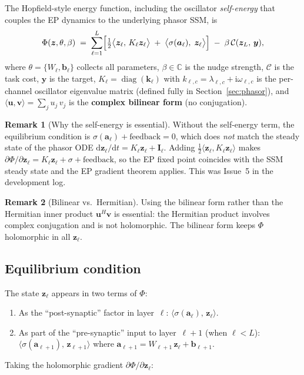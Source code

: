 \documentclass[11pt]{article}
\newcommand{\C}{\mathbb{C}}
\newcommand{\im}{\mathrm{i}}
\newcommand{\dd}{\mathrm{d}}
\theoremstyle{definition}
\newtheorem{remark}{Remark}
\DeclareMathOperator{\diag}{diag}
\begin{document}
The Hopfield-style energy function, including the oscillator
\emph{self-energy} that couples the EP dynamics to the underlying
phasor SSM, is
\begin{equation}\label{eq:energy}
  \Phi(\bm{z},\theta,\beta)
  \;=\;
  \sum_{\ell=1}^{L}
    \Bigl[
      \tfrac{1}{2}\bigl\langle\bm{z}_\ell,\,K_\ell\bm{z}_\ell\bigr\rangle
      \;+\;
      \bigl\langle
        \sigma(\bm{a}_\ell),\;
        \bm{z}_\ell
      \bigr\rangle
    \Bigr]
  \;-\;
  \beta\,\mathcal{C}(\bm{z}_L,\,\bm{y}),
\end{equation}
where $\theta=\{W_\ell,\bm{b}_\ell\}$ collects all parameters,
$\beta\in\C$ is the nudge strength,
$\mathcal{C}$ is the task cost, $\bm{y}$ is the target,
$K_\ell=\diag(\bm{k}_\ell)$ with $k_{\ell,c}=\lambda_{\ell,c}+\im\omega_{\ell,c}$
is the per-channel oscillator eigenvalue matrix (defined fully in
Section~\ref{sec:phasor}), and
$\langle\bm{u},\bm{v}\rangle = \sum_j u_j\,v_j$
is the \textbf{complex bilinear form} (no conjugation).

\begin{remark}[Why the self-energy is essential]
Without the self-energy term, the equilibrium condition is
$\sigma(\bm{a}_\ell)+\text{feedback}=0$, which does \emph{not}
match the steady state of the phasor ODE
$\dd\bm{z}_\ell/\dd t = K_\ell\bm{z}_\ell+\bm{I}_\ell$.  Adding
$\tfrac{1}{2}\langle\bm{z}_\ell,K_\ell\bm{z}_\ell\rangle$ makes
$\partial\Phi/\partial\bm{z}_\ell = K_\ell\bm{z}_\ell+\sigma+\text{feedback}$,
so the EP fixed point coincides with the SSM steady state and the
EP gradient theorem applies.  This was Issue~5 in the development log.
\end{remark}

\begin{remark}[Bilinear vs.\ Hermitian]
Using the bilinear form rather than the Hermitian inner product
$\bm{u}^H\bm{v}$ is essential:  the Hermitian product involves
complex conjugation and is not holomorphic.  The bilinear form keeps
$\Phi$ holomorphic in all $\bm{z}_\ell$.
\end{remark}

\subsection{Equilibrium condition}\label{sec:eq-cond}

The state $\bm{z}_\ell$ appears in two terms of $\Phi$:
\begin{enumerate}[label=(\alph*)]
\item As the ``post-synaptic'' factor in layer~$\ell$:
  $\langle\sigma(\bm{a}_\ell),\,\bm{z}_\ell\rangle$.
\item As part of the ``pre-synaptic'' input to layer~$\ell+1$
  (when $\ell<L$):
  $\langle\sigma(\bm{a}_{\ell+1}),\,\bm{z}_{\ell+1}\rangle$
  where $\bm{a}_{\ell+1}=W_{\ell+1}\,\bm{z}_\ell+\bm{b}_{\ell+1}$.
\end{enumerate}
Taking the holomorphic gradient $\partial\Phi/\partial\bm{z}_\ell$:
\end{document}
